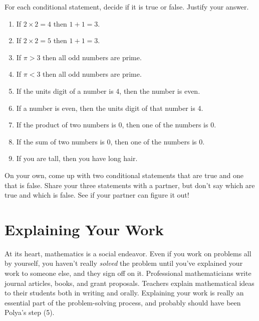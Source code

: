 \begin{thinkpair*}
For each conditional statement, decide if it is true or false.  Justify your answer.  
\begin{enumerate}
\item
If $2 \times 2 = 4$ then $1 + 1 = 3$.

\item
If $2 \times 2 = 5$ then $1 + 1 = 3$.


\item
If $\pi > 3$ then all odd numbers are prime.

 \item
If $\pi < 3$ then all odd numbers are prime.


\item
If the units digit of a number is 4, then the number is even.

\item
If a number is even, then the units digit of that number is 4.

\item
If the product of two numbers is 0, then one of the numbers is 0.

\item
If the sum of two numbers is 0, then one of the numbers is 0.

\item
If you are tall, then you have long hair.



\end{enumerate}
\end{thinkpair*}


\begin{thinkpair*}
On your own, come up with two conditional statements that are true and one that is false.  Share your three statements with a partner, but don't say which are true and which is false.  See if your partner can figure it out!
\end{thinkpair*}



\section{Explaining Your Work}
At its heart, mathematics is a social endeavor.  Even if you work on problems all by yourself, you haven't really \emph{solved} the problem until you've explained your work to someone else, and they sign off on it.  Professional mathematicians write journal articles, books, and grant proposals.  Teachers explain mathematical ideas to their students both in writing and orally.  
Explaining your work is really an essential part of the problem-solving process, and probably should have been Polya's step (5).


